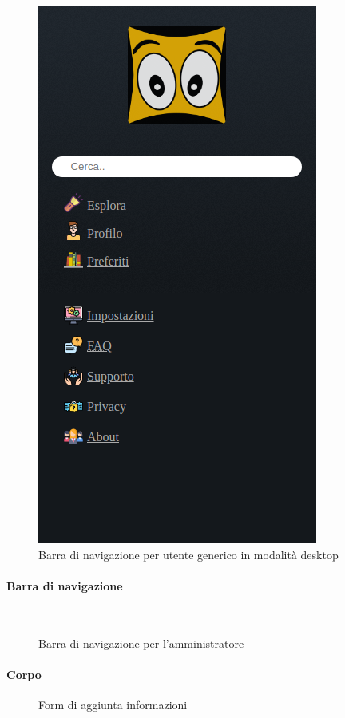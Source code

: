 \begin{figure}[h!]
	\centerline{\includegraphics[scale=0.45]{img/nav_bar.png}}
	\caption{Barra di navigazione per utente generico in modalità desktop}
	\label{fig:navbarGU}
\end{figure}


\newpage


\paragraph{Barra di navigazione}
~\\

\begin{figure}[h!]
	\caption{Barra di navigazione per l'amministratore}
	\label{fig:navbarAD}
\end{figure}
\paragraph{Corpo}
\begin{figure}[h!]
	\caption{Form di aggiunta informazioni}
	\label{fig:addForm}
\end{figure}

